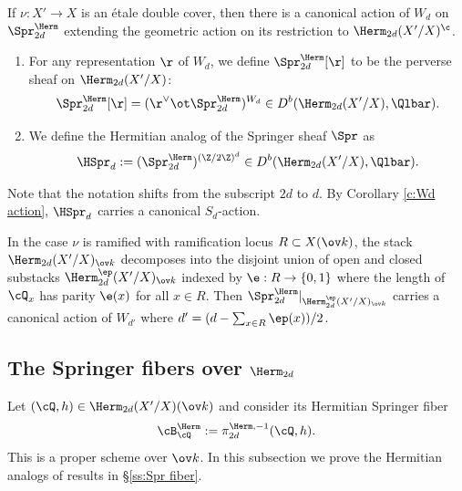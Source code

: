 \begin{cor}
\notready\label{c:Wd action} If $\nu:X'\to X$ is an \'etale double cover, then there is a canonical action of $W_{d}$ on $\Spr^{\Herm}_{2d}$ extending the geometric action on its restriction to $\Herm_{2d}(X'/X)^{\c}$.
\end{cor}


\begin{defn}
\notready\label{d:Spr isotypic}
\begin{enumerate}
\item For any representation $\r$ of $W_{d}$, we define $\Spr^{\Herm}_{2d}[\r]$ to be the perverse sheaf  on $\Herm_{2d}(X'/X)$:
\begin{equation*}
\Spr^{\Herm}_{2d}[\r]=(\r^{\vee}\ot \Spr^{\Herm}_{2d})^{W_{d}}\in D^b(\Herm_{2d}(X'/X),\Qlbar).
\end{equation*}
\item We define the Hermitian  analog of the Springer sheaf $\Spr$ as
\begin{eqnarray*}
\HSpr_{d}:=(\Spr^{\Herm}_{2d})^{(\Z/2\Z)^{d}}\in D^b(\Herm_{2d}(X'/X),\Qlbar).
\end{eqnarray*}
\end{enumerate}
\end{defn}
Note that the notation shifts from the subscript $2d$ to $d$. By Corollary \ref{c:Wd action}, $\HSpr_{d}$ carries a canonical $S_{d}$-action.

\begin{remark}
\notready In the case $\nu$ is ramified with  ramification locus $R\subset X(\ov k)$, the stack $\Herm_{2d}(X'/X)_{\ov k}$ decomposes into the disjoint union of open and closed substacks $\Herm^{\ep}_{2d}(X'/X)_{\ov k}$ indexed by $\e: R\to \{0,1\}$ where the length of $\cQ_{x}$ has parity $\e(x)$ for all $x\in R$. Then $\Spr^{\Herm}_{2d}|_{\Herm^{\ep}_{2d}(X'/X)_{\ov k}}$ carries a canonical action of $W_{d'}$ where $d'=(d-\sum_{x\in R}\ep(x))/2$.
\end{remark}


\subsection{The Springer fibers over $\Herm_{2d}$}\label{ss:Herm fiber}
Let $(\cQ,h)\in \Herm_{2d}(X'/X)(\ov k)$ and consider its Hermitian Springer fiber
\begin{equation*}
\cB^{\Herm}_{\cQ}:=\pi^{\Herm,-1}_{2d}(\cQ,h).
\end{equation*}
This is a proper scheme over $\ov k$. In this subsection we prove the Hermitian analogs of results in \S\ref{ss:Spr fiber}.

